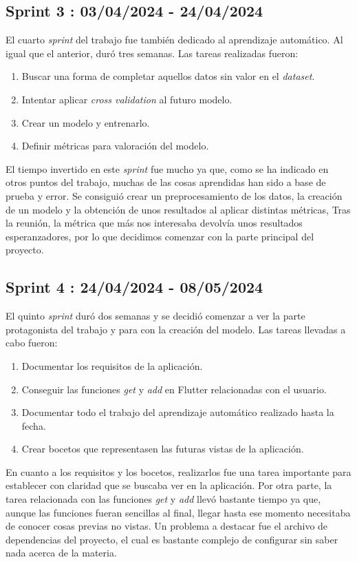 \subsection{Sprint 3 : 03/04/2024 - 24/04/2024}

	El cuarto \emph{sprint} del trabajo fue también dedicado al aprendizaje automático. Al igual que el anterior, duró tres semanas. Las tareas realizadas fueron:
	\begin{enumerate}
		\item Buscar una forma de completar aquellos datos sin valor en el \emph{dataset}.
		\item Intentar aplicar \emph{cross validation} al futuro modelo.
		\item Crear un modelo y entrenarlo.
		\item Definir métricas para valoración del modelo.
	\end{enumerate}
	El tiempo invertido en este \emph{sprint} fue mucho ya que, como se ha indicado en otros puntos del trabajo, muchas de las cosas aprendidas han sido a base de prueba y error. Se consiguió crear un preprocesamiento de los datos, la creación de un modelo y la obtención de unos resultados al aplicar distintas métricas, Tras la reunión, la métrica que más nos interesaba devolvía unos resultados esperanzadores, por lo que decidimos comenzar con la parte principal del proyecto.
	
\subsection{Sprint 4 : 24/04/2024 - 08/05/2024}

	El quinto \emph{sprint} duró dos semanas y se decidió comenzar a ver la parte protagonista del trabajo y para con la creación del modelo. Las tareas llevadas a cabo fueron:
	\begin{enumerate}
		\item Documentar los requisitos de la aplicación.
		\item Conseguir las funciones \emph{get} y \emph{add} en Flutter relacionadas con el usuario.
		\item Documentar todo el trabajo del aprendizaje automático realizado hasta la fecha.
		\item Crear bocetos que representasen las futuras vistas de la aplicación.
	\end{enumerate}
	En cuanto a los requisitos y los bocetos, realizarlos fue una tarea importante para establecer con claridad que se buscaba ver en la aplicación. Por otra parte, la tarea relacionada con las funciones \emph{get} y \emph{add} llevó bastante tiempo ya que, aunque las funciones fueran sencillas al final, llegar hasta ese momento necesitaba de conocer cosas previas no vistas. Un problema a destacar fue el archivo de dependencias del proyecto, el cual es bastante complejo de configurar sin saber nada acerca de la materia.
	
